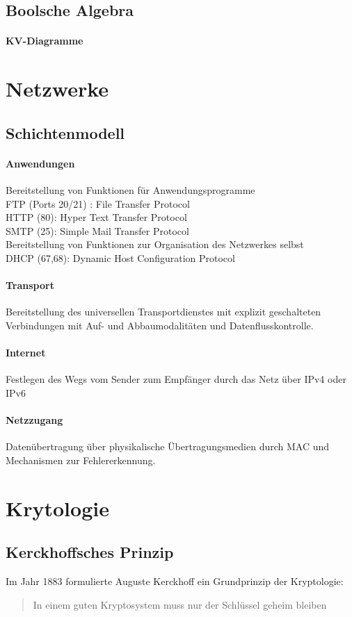 \documentclass[10pt]{article}
\begin{document}
\subsection{Boolsche Algebra}
\paragraph{KV-Diagramme}

\section{Netzwerke}
\subsection{Schichtenmodell}
\paragraph{Anwendungen}
Bereitstellung von Funktionen für Anwendungsprogramme\\
FTP (Ports 20/21) : File Transfer Protocol\\
HTTP (80): Hyper Text Transfer Protocol\\
SMTP (25): Simple Mail Transfer Protocol\\
Bereitstellung von Funktionen zur Organisation des Netzwerkes selbst\\
DHCP (67,68): Dynamic Host Configuration Protocol
\paragraph{Transport}
Bereitstellung des universellen Transportdienstes mit explizit geschalteten Verbindungen
mit Auf- und Abbaumodalitäten und Datenflusskontrolle.
\paragraph{Internet}
Festlegen des Wegs vom Sender zum Empfänger durch das Netz über IPv4 oder IPv6
\paragraph{Netzzugang}
Datenübertragung über physikalische Übertragungsmedien durch MAC und Mechanismen zur Fehlererkennung.
\section{Krytologie}
\subsection{Kerckhoffsches Prinzip}
Im Jahr 1883 formulierte Auguste Kerckhoff ein Grundprinzip der Kryptologie:
\begin{quote}
In einem guten Kryptosystem muss nur der Schlüssel geheim bleiben
\end{quote}
\end{document}
